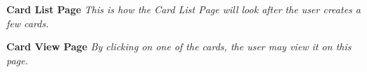 \documentclass[12pt]{article}%
\begin{document}
\begin{center}
    \clearpage
    {\bf \Large Card List Page}
    {\it This is how the Card List Page will look after the user creates a few cards.}

    \clearpage
    {\bf \Large Card View Page}
    {\it By clicking on one of the cards, the user may view it on this page.}


\end{center}
\end{document}
